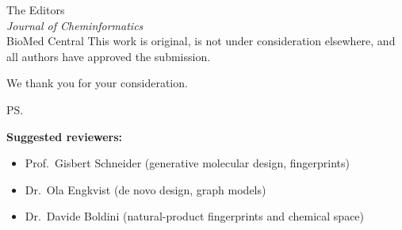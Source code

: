 \documentclass[11pt,a4paper]{letter}
\begin{document}
\begin{letter}{%
  The Editors \\
  \textit{Journal of Cheminformatics} \\
  BioMed Central
}
This work is original, is not under consideration elsewhere, and all authors have approved the submission.

\closing{We thank you for your consideration.}

\ps{%
\textbf{Suggested reviewers:}\\
\begin{itemize}[leftmargin=*, itemsep=1pt]
  \item Prof.\ Gisbert Schneider (generative molecular design, fingerprints)
  \item Dr.\ Ola Engkvist (de novo design, graph models)
  \item Dr.\ Davide Boldini (natural-product fingerprints and chemical space)
\end{itemize}
}

\end{letter}
\end{document}
